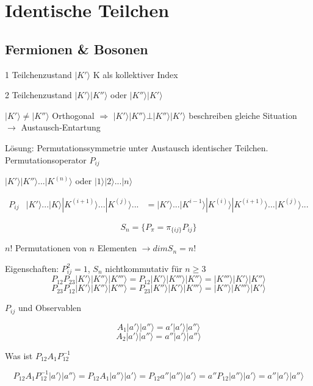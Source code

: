 



\tableofcontents
\setcounter{chapter}{3}
\chapter{Identische Teilchen}

\section{Fermionen \& Bosonen}

1 Teilchenzustand \(|K'\rangle \) K als kollektiver Index

2 Teilchenzustand \(|K'\rangle|K''\rangle \) oder \(|K''\rangle|K'\rangle \)

 \(|K'\rangle\neq |K''\rangle \) Orthogonal \(\Rightarrow \) \(|K'\rangle|K''\rangle \bot |K''\rangle|K'\rangle \) beschreiben gleiche Situation \(\rightarrow\) Austausch-Entartung

Lösung: Permutationssymmetrie unter Austausch identischer Teilchen. Permutationsoperator \(P_{ij}\)
 
\(|K'\rangle|K''\rangle...|K^{(n)}\rangle \) oder \(|1\rangle|2\rangle...|n\rangle \)

\begin{align}
P_{ij}&|K'\rangle ...|K\rangle|K^{(i+1)}\rangle ...|K^{(j)}\rangle ...
&=|K'\rangle ...|K^{i-1}\rangle|K^{(i)}\rangle|K^{(i+1)}\rangle ...|K^{(j)}\rangle ...
\end{align}

\[S_n = \{ P_\pi = \pi_{\{ij\}}P_{ij} \}\]

\(n!\) Permutationen von \(n\) Elementen \(\rightarrow dim S_n = n! \)

Eigenschaften: \(P^2_{ij}=1\), \(S_n\) nichtkommutativ für \(n\geq 3\)
\[P_{12}P_{23}|K'\rangle|K''\rangle|K'''\rangle= P_{12}|K'\rangle|K'''\rangle|K''\rangle= |K'''\rangle|K'\rangle|K''\rangle\]
\[P_{23}P_{12}|K'\rangle|K''\rangle|K'''\rangle= P_{23}|K''\rangle|K'\rangle|K'''\rangle= |K''\rangle|K'''\rangle|K'\rangle\]


\(P_{ij}\) und Observablen

\[A_1|a'\rangle |a''\rangle = a'|a'\rangle |a''\rangle\]
\[A_2|a'\rangle |a''\rangle = a''|a'\rangle |a''\rangle\]


Was ist \(P_{12}A_1P_{12}^{-1}\)

\[P_{12}A_1P_{12}^{-1}|a'\rangle |a''\rangle = P_{12}A_1 |a''\rangle |a'\rangle =  P_{12}a''|a''\rangle |a'\rangle = a'' P_{12}|a''\rangle |a'\rangle  = a''|a'\rangle |a''\rangle\]

